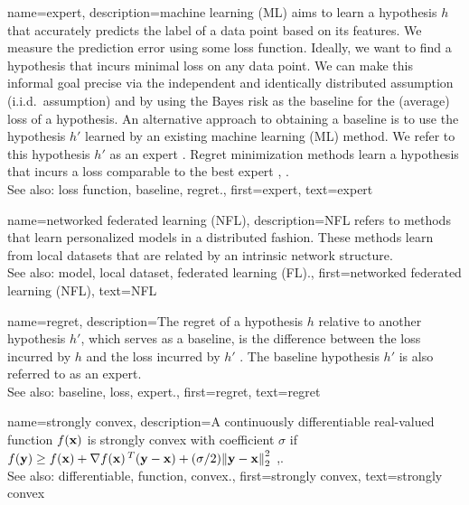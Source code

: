 {
{name={expert},
	description={machine learning (ML) aims to learn a hypothesis $h$ that accurately predicts the label 
		of a data point based on its features. We measure the prediction error using 
		some loss function. Ideally, we want to find a hypothesis that incurs minimal loss 
		on any data point. We can make this informal goal precise via the independent and identically distributed assumption (i.i.d.\ assumption) 
		and by using the Bayes risk as the baseline for the (average) loss of a hypothesis. 
		An alternative approach to obtaining a baseline is to use the hypothesis $h'$ learned 
		by an existing machine learning (ML) method. We refer to this hypothesis $h'$ as an expert \cite{PredictionLearningGames}. 
		Regret minimization methods learn a hypothesis
		that incurs a loss comparable to the best expert \cite{PredictionLearningGames}, \cite{HazanOCO}.
					\\ 
		See also: loss function, baseline, regret.},
	first={expert},
	text={expert} 
}

{name={networked federated learning (NFL)},
	description={NFL refers 
		to methods that learn personalized models in a distributed fashion. These methods learn from local datasets 
		that are related by an intrinsic network structure.
					\\ 
		See also: model, local dataset, federated learning (FL).},
	first={networked federated learning (NFL)},
	text={NFL} 
}


{name={regret},
	description={The regret of a hypothesis $h$ relative to 
		another hypothesis $h'$, which serves as a baseline, 
		is the difference between the loss incurred by $h$ and the loss 
		incurred by $h'$ \cite{PredictionLearningGames}. 
		The baseline hypothesis $h'$ is also referred to as an expert.
					\\ 
		See also: baseline, loss, expert.},
	first={regret},
	text={regret} 
}

{name={strongly convex},
	description={A continuously differentiable real-valued 
		function $f({\bf x})$ is strongly convex with coefficient $\sigma$ if $f({\bf y}) \geq f({\bf x}) + \nabla f({\bf x})\,^{T} ({\bf y} - {\bf x}) + (\sigma/2) \mleft\lVert {\bf y} - {\bf x} \mright\rVert_{2}^{2}$ \cite{nesterov04},\cite[Sec. B.1.1]{CvxAlgBertsekas}.
					\\ 
		See also: differentiable, function, convex.},
	first={strongly convex},
	text={strongly convex} 
}

}
